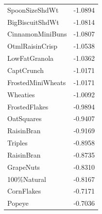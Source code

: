\begin{longtable}{@{}lr@{}}
SpoonSizeShdWt & -1.0894 \\
BigBiscuitShdWt & -1.0814 \\
CinnamonMiniBuns & -1.0807 \\
OtmlRaisinCrisp & -1.0538 \\
LowFatGranola & -1.0362 \\
CaptCrunch & -1.0171 \\
FrostedMiniWheats & -1.0171 \\
Wheaties & -1.0092 \\
FrostedFlakes & -0.9894 \\
OatSquares & -0.9407 \\
RaisinBran & -0.9169 \\
Triples & -0.8958 \\
RaisinBran & -0.8735 \\
GrapeNuts & -0.8310 \\
100\%Natural & -0.8167 \\
CornFlakes & -0.7171 \\
Popeye & -0.7036 \\
\bottomrule
\end{longtable}
\endgroup